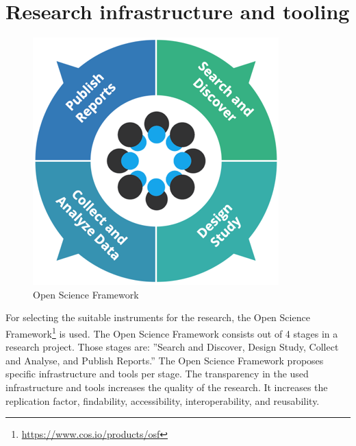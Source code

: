 \section{Research infrastructure and tooling}
\label{sec:researchinfraandtooling}
\begin{figure}
	\begin{center}
		\includegraphics[width=0.5\linewidth]{images/osfframework}
		\caption[Open Science Framework]{Open Science Framework}
		\label{fig:osfframework}
	\end{center}
\end{figure}
For selecting the suitable instruments for the research, the Open Science Framework\footnote{\url{https://www.cos.io/products/osf}} is used. The Open Science Framework consists out of 4 stages in a research project. Those stages are: ''Search and Discover, Design Study, Collect and Analyse, and Publish Reports.'' The Open Science Framework proposes specific infrastructure and tools per stage. The transparency in the used infrastructure and tools increases the quality of the research. It increases the replication factor, findability, accessibility, interoperability, and reusability.
